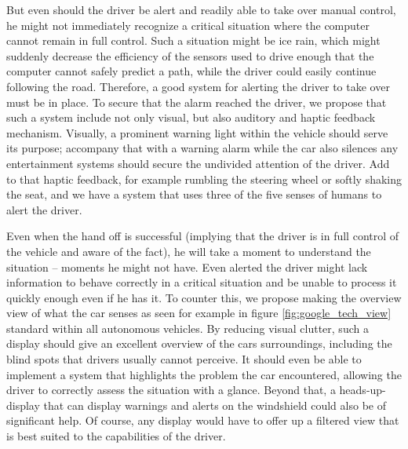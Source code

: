 \documentclass{acm_proc_article-sp}
\begin{document}
But even should the driver be alert and readily able to take over manual control, he might not immediately recognize a critical situation where the computer cannot remain in full control.
Such a situation might be ice rain, which might suddenly decrease the efficiency of the sensors used to drive enough that the computer cannot safely predict a path, while the driver could easily continue following the road.
Therefore, a good system for alerting the driver to take over must be in place.
To secure that the alarm reached the driver, we propose that such a system include not only visual, but also auditory and haptic feedback mechanism.
Visually, a prominent warning light within the vehicle should serve its purpose; accompany that with a warning alarm while the car also silences any entertainment systems should secure the undivided attention of the driver.
Add to that haptic feedback, for example rumbling the steering wheel or softly shaking the seat, and we have a system that uses three of the five senses of humans to alert the driver.

Even when the hand off is successful (implying that the driver is in full control of the vehicle and aware of the fact), he will take a moment to understand the situation – moments he might not have.
Even alerted the driver might lack information to behave correctly in a critical situation and be unable to process it quickly enough even if he has it.
To counter this, we propose making the overview view of what the car senses as seen for example in figure \ref{fig:google_tech_view} standard within all autonomous vehicles.
By reducing visual clutter, such a display should give an excellent overview of the cars surroundings, including the blind spots that drivers usually cannot perceive.
It should even be able to implement a system that highlights the problem the car encountered, allowing the driver to correctly assess the situation with a glance.
Beyond that, a heads-up-display that can display warnings and alerts on the windshield could also be of significant help.
Of course, any display would have to offer up a filtered view that is best suited to the capabilities of the driver.
\end{document}
